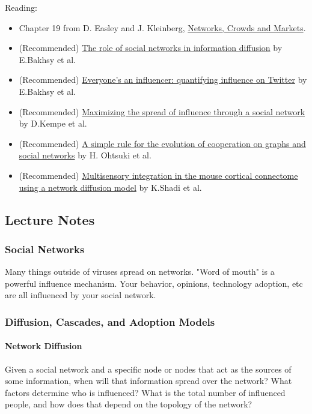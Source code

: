 \documentclass[11pt]{scrartcl} %
\begin{document}
Reading:
\begin{itemize}
	\item Chapter 19 from D. Easley and J. Kleinberg, \href{https://www.cs.cornell.edu/home/kleinber/networks-book/networks-book-ch19.pdf}{Networks, Crowds and Markets}.
	\item (Recommended) \href{https://dl.acm.org/doi/abs/10.1145/2187836.2187907}{The role of social networks in information diffusion} by E.Bakhsy et al.
	\item (Recommended) \href{https://dl.acm.org/doi/abs/10.1145/1935826.1935845}{Everyone's an influencer: quantifying influence on Twitter} by E.Bakhsy et al.
	\item (Recommended) \href{https://dl.acm.org/doi/abs/10.1145/956750.956769}{Maximizing the spread of influence through a social network} by D.Kempe et al.
	\item (Recommended) \href{https://www.nature.com/articles/nature04605}{A simple rule for the evolution of cooperation on graphs and social networks} by H. Ohtsuki et al.
	\item (Recommended) \href{https://direct.mit.edu/netn/article/4/4/1030/95854/Multisensory-integration-in-the-mouse-cortical}{Multisensory integration in the mouse cortical connectome using a network diffusion model} by K.Shadi et al.

\end{itemize}

\subsection{Lecture Notes}

\subsubsection{Social Networks}
Many things outside of viruses spread on networks. "Word of mouth" is a powerful influence mechanism. Your behavior, opinions, technology adoption, etc are all influenced by your social network.

\subsubsection{Diffusion, Cascades, and Adoption Models}
\paragraph{Network Diffusion} Given a social network and a specific node or nodes that act as the sources of some information, when will that information spread over the network? What factors determine who is influenced? What is the total number of influenced people, and how does that depend on the topology of the network?
\end{document}
